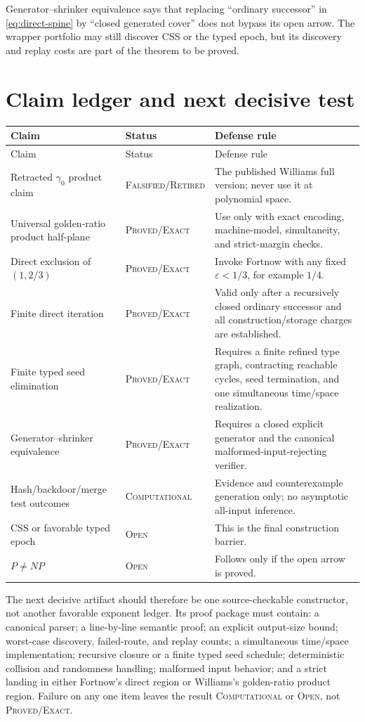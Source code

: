 \documentclass[11pt]{article}
\newcommand{\Exact}{\textsc{Proved/Exact}}
\newcommand{\Comp}{\textsc{Computational}}
\newcommand{\Open}{\textsc{Open}}
\newcommand{\Retired}{\textsc{Falsified/}\allowbreak\textsc{Retired}}
\begin{document}
Generator--shrinker equivalence says that replacing ``ordinary successor''
in \eqref{eq:direct-spine} by ``closed generated cover'' does not bypass its
open arrow.  The wrapper portfolio may still discover CSS or the typed epoch,
but its discovery and replay costs are part of the theorem to be proved.

\section{Claim ledger and next decisive test}

{\small
\begin{longtable}{L{0.24\textwidth}L{0.18\textwidth}L{0.50\textwidth}}
\toprule
Claim & Status & Defense rule \\
\midrule
\endfirsthead
\toprule
Claim & Status & Defense rule \\
\midrule
\endhead
\bottomrule
\endfoot
Retracted $\gamma_0$ product claim & \Retired{} & The
published Williams full version; never use it at polynomial space. \\
Universal golden-ratio product half-plane & \Exact{} & Use only with exact
encoding, machine-model, simultaneity, and strict-margin checks. \\
Direct exclusion of $(1,2/3)$ & \Exact{} & Invoke Fortnow with any fixed
$\varepsilon<1/3$, for example $1/4$. \\
Finite direct iteration & \Exact{} & Valid only after a recursively closed
ordinary successor and all construction/storage charges are established. \\
Finite typed seed elimination & \Exact{} & Requires a finite refined type
graph, contracting reachable cycles, seed termination, and one simultaneous
time/space realization. \\
Generator--shrinker equivalence & \Exact{} & Requires a closed explicit
generator and the canonical malformed-input-rejecting verifier. \\
Hash/backdoor/merge test outcomes & \Comp{} & Evidence and counterexample
generation only; no asymptotic all-input inference. \\
CSS or favorable typed epoch & \Open{} & This is the final construction
barrier. \\
$P\ne NP$ & \Open{} & Follows only if the open arrow is proved. \\
\end{longtable}
}

The next decisive artifact should therefore be one source-checkable
constructor, not another favorable exponent ledger.  Its proof package must
contain: a canonical parser; a line-by-line semantic proof; an explicit
output-size bound; worst-case discovery, failed-route, and replay counts; a
simultaneous time/space implementation; recursive closure or a finite typed
seed schedule; deterministic collision and randomness handling; malformed
input behavior; and a strict landing in either Fortnow's direct region or
Williams's golden-ratio product region.  Failure on any one item leaves the
result \Comp{} or \Open{}, not \Exact{}.
\end{document}
